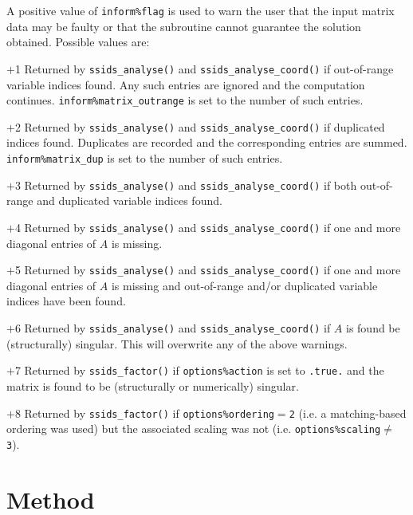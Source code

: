 \documentclass{spral}
\begin{document}
A positive value of {\tt inform\%flag}
is used to warn the user that the input matrix data may be faulty or that
the subroutine cannot guarantee the solution obtained.
Possible values are:
\begin{description}
\item{$+$1} Returned by {\tt ssids\_analyse()}
and {\tt ssids\_analyse\_coord()} if out-of-range variable
indices found.
Any such entries are ignored  and the computation continues.
{\tt inform\%matrix\_outrange} is set to the number of such entries.

\item{$+$2} Returned by {\tt ssids\_analyse()} and {\tt ssids\_analyse\_coord()}
if duplicated indices found. Duplicates are recorded and the corresponding
entries are summed. {\tt inform\%matrix\_dup} is set to the number of such entries.

\item{$+$3} Returned by {\tt ssids\_analyse()} and {\tt ssids\_analyse\_coord()} if both
out-of-range and duplicated variable indices found.

\item{$+$4} Returned by {\tt ssids\_analyse()}  and {\tt ssids\_analyse\_coord()}
if  one and more diagonal entries
of $A$ is missing.

\item{$+$5} Returned by {\tt ssids\_analyse()}  and {\tt ssids\_analyse\_coord()}
if  one and more diagonal entries
of $A$ is missing  and
out-of-range and/or duplicated variable indices have been found.

\item{$+$6} Returned by {\tt ssids\_analyse()}  and {\tt ssids\_analyse\_coord()} if
$A$ is found be (structurally) singular. This will overwrite any of the above warnings.

\item{$+$7} Returned by {\tt ssids\_factor()} if {\tt options\%action} is set
to {\tt .true.} and the matrix is found to be (structurally or numerically)
singular.

\item{$+$8} Returned by {\tt ssids\_factor()} if
{\tt options\%ordering}$=${\tt 2} (i.e.
a matching-based ordering was used) but the associated scaling was not (i.e. {\tt options\%scaling}$\ne$
{\tt 3}).

\end{description}

\section{Method} \label{method}
\end{document}
